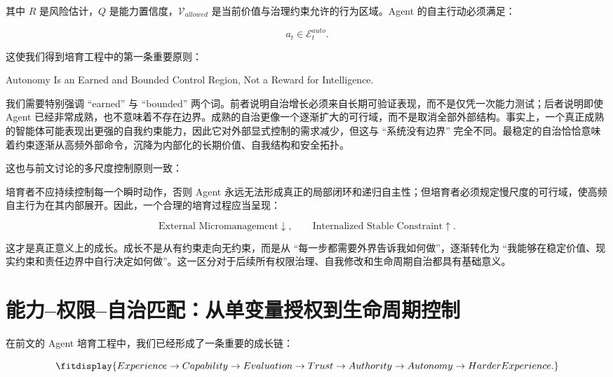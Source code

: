 其中 $R$ 是风险估计，$Q$ 是能力置信度，$\mathcal V_{allowed}$ 是当前价值与治理约束允许的行为区域。Agent 的自主行动必须满足：

\[
a_t\in\mathcal E^{auto}_t .
\]

这使我们得到培育工程中的第一条重要原则：

\begin{proposition*}
Autonomy Is an Earned and Bounded Control Region, Not a Reward for Intelligence.
\end{proposition*}

我们需要特别强调 ``earned'' 与 ``bounded'' 两个词。前者说明自治增长必须来自长期可验证表现，而不是仅凭一次能力测试；后者说明即使 Agent 已经非常成熟，也不意味着不存在边界。成熟的自治更像一个逐渐扩大的可行域，而不是取消全部外部结构。事实上，一个真正成熟的智能体可能表现出更强的自我约束能力，因此它对外部显式控制的需求减少，但这与 ``系统没有边界'' 完全不同。最稳定的自治恰恰意味着约束逐渐从高频外部命令，沉降为内部化的长期价值、自我结构和安全拓扑。

这也与前文讨论的多尺度控制原则一致：

\begin{statementbox}
\centering
{}
\end{statementbox}

培育者不应持续控制每一个瞬时动作，否则 Agent 永远无法形成真正的局部闭环和递归自主性；但培育者必须规定慢尺度的可行域，使高频自主行为在其内部展开。因此，一个合理的培育过程应当呈现：

\[
\text{External Micromanagement}
\downarrow,
\qquad
\text{Internalized Stable Constraint}
\uparrow .
\]

这才是真正意义上的成长。成长不是从有约束走向无约束，而是从 ``每一步都需要外界告诉我如何做''，逐渐转化为 ``我能够在稳定价值、现实约束和责任边界中自行决定如何做''。这一区分对于后续所有权限治理、自我修改和生命周期自治都具有基础意义。

\section{能力--权限--自治匹配：从单变量授权到生命周期控制}

在前文的 Agent 培育工程中，我们已经形成了一条重要的成长链：

\[
\fitdisplay{
Experience
\rightarrow
Capability
\rightarrow
Evaluation
\rightarrow
Trust
\rightarrow
Authority
\rightarrow
Autonomy
\rightarrow
HarderExperience .
}
\]


